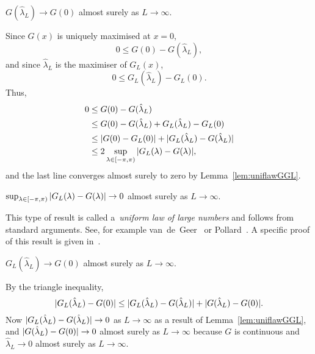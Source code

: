 \documentclass[journal]{IEEEtran}
\begin{document}
\begin{lemma}\label{lem:convtoexpGlamL} 
$G(\hat{\lambda}_L) \rightarrow G(0)$ almost surely as $L \rightarrow \infty$.
\end{lemma}
\begin{IEEEproof}
Since $G(x)$ is uniquely maximised at $x=0$,
\[
0 \leq G(0) - G(\hat{\lambda}_L),
\]
and since $\hat{\lambda}_L$ is the maximiser of $G_L(x)$,
\[ 
0 \leq G_L(\hat{\lambda}_L) - G_L(0).
\]
Thus,
\begin{align*}
0 &\leq G(0) - G(\hat{\lambda}_L) \\ 
& \leq G(0) - G(\hat{\lambda}_L) + G_L(\hat{\lambda}_L) - G_L(0) \\
& \leq |G(0) - G_L(0)| + |G_L(\hat{\lambda}_L) - G(\hat{\lambda}_L)| \\
&\leq 2\sup_{\lambda \in [-\pi, \pi)} {\vert G_L(\lambda) - G(\lambda) \vert},
\end{align*}
and the last line converges almost surely to zero by Lemma~\ref{lem:uniflawGGL}.
\end{IEEEproof}

\begin{lemma}\label{lem:uniflawGGL} 
$\sup_{\lambda \in [-\pi, \pi)}{\vert G_L(\lambda) - G(\lambda) \vert} \rightarrow 0$ almost surely as $L \rightarrow \infty$.
\end{lemma}
\begin{IEEEproof}
This type of result is called a~\emph{uniform law of large numbers} and follows from standard arguments.  See, for example van~de~Geer~\cite[Ch.~3]{van2009empirical} or Pollard~\citep[Ch.~2]{Pollard_conv_stat_proc_1984}.  A specific proof of this result is given in~\cite[Lemma~2]{McKilliam_leastsqPSKpilotsdata_arxiv}.
\end{IEEEproof}

\begin{lemma}\label{lem:GLtoG0}
$G_L(\hat{\lambda}_L) \rightarrow G(0)$ almost surely as $L \rightarrow \infty$.
\end{lemma}
\begin{IEEEproof}
By the triangle inequality,
\[
{\vert G_L(\hat{\lambda}_L) - G(0) \vert} \leq {\vert G_L(\hat{\lambda}_L) - G(\hat{\lambda}_L) \vert} + {\vert G(\hat{\lambda}_L) - G(0) \vert}.
\]
Now ${\vert G_L(\hat{\lambda}_L) - G(\hat{\lambda}_L) \vert} \rightarrow 0$ as $L \rightarrow \infty$ as a result of Lemma~\ref{lem:uniflawGGL}, and ${\vert G(\hat{\lambda}_L) - G(0) \vert} \rightarrow 0$ almost surely as $L \rightarrow \infty$ because $G$ is continuous and $\hat{\lambda}_L \rightarrow 0$ almost surely as $L \rightarrow \infty$.
\end{IEEEproof}
\end{document}
